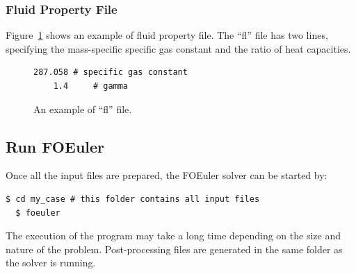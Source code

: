\documentclass[]{article}
\begin{document}
\subsubsection{Fluid Property File}

Figure~\ref{lst:fl} shows an example of fluid property file.
The ``fl'' file has two lines, specifying the mass-specific specific gas constant and the ratio of
heat capacities.

\begin{figure}[h!]
  \begin{lstlisting}[backgroundcolor=\color{lightgray}]
    287.058	# specific gas constant
    1.4		# gamma
  \end{lstlisting}
  \caption{An example of ``fl'' file.}
  \label{lst:fl}
\end{figure}

\subsection{Run FOEuler}

Once all the input files are prepared, the FOEuler solver can be started by:
\begin{lstlisting}[backgroundcolor=\color{lightgray}]
  $ cd my_case # this folder contains all input files
  $ foeuler
\end{lstlisting}
The execution of the program may take a long time depending on the size and nature of the problem.
Post-processing files are generated in the same folder as the solver is running.
\end{document}

